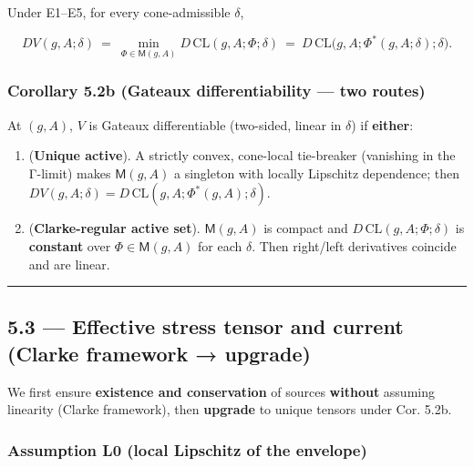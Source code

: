 \documentclass[
]{article}
\providecommand{\tightlist}{%
  \setlength{\itemsep}{0pt}\setlength{\parskip}{0pt}}
\numberwithin{equation}{section}
\begin{document}
Under E1--E5, for every cone-admissible \(\delta\),

\[
\boxed{\
D V(g,A;\delta)\ =\ \min_{\Phi\in\mathsf M(g,A)} D\,\mathrm{CL}(g,A;\Phi;\delta)\ =\ D\,\mathrm{CL}\big(g,A;\Phi^*(g,A;\delta);\delta\big).
\ }
\]

\hypertarget{corollary-5.2b-gateaux-differentiability-two-routes}{%
\subsubsection{Corollary 5.2b (Gateaux differentiability --- two
routes)}\label{corollary-5.2b-gateaux-differentiability-two-routes}}

At \((g,A)\), \(V\) is Gateaux differentiable (two-sided, linear in
\(\delta\)) if \textbf{either}:

\begin{enumerate}
\def\labelenumi{\arabic{enumi}.}
\tightlist
\item
  (\textbf{Unique active}). A strictly convex, cone-local tie-breaker
  (vanishing in the Γ-limit) makes \(\mathsf M(g,A)\) a singleton with
  locally Lipschitz dependence; then
  \(D V(g,A;\delta)=D\,\mathrm{CL}(g,A;\Phi^*(g,A);\delta)\).
\item
  (\textbf{Clarke-regular active set}). \(\mathsf M(g,A)\) is compact
  and \(D\,\mathrm{CL}(g,A;\Phi;\delta)\) is \textbf{constant} over
  \(\Phi\in\mathsf M(g,A)\) for each \(\delta\). Then right/left
  derivatives coincide and are linear.
\end{enumerate}

\begin{center}\rule{0.5\linewidth}{0.5pt}\end{center}

\hypertarget{effective-stress-tensor-and-current-clarke-framework-upgrade}{%
\subsection{5.3 --- Effective stress tensor and current (Clarke
framework →
upgrade)}\label{effective-stress-tensor-and-current-clarke-framework-upgrade}}

We first ensure \textbf{existence and conservation} of sources
\textbf{without} assuming linearity (Clarke framework), then
\textbf{upgrade} to unique tensors under Cor. 5.2b.

\hypertarget{assumption-l0-local-lipschitz-of-the-envelope}{%
\subsubsection{Assumption L0 (local Lipschitz of the
envelope)}\label{assumption-l0-local-lipschitz-of-the-envelope}}
\end{document}
